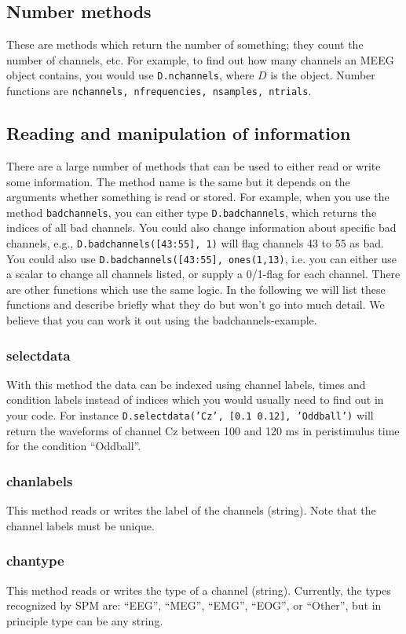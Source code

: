 \subsection{Number methods}
These are methods which return the number of something; they count the number of channels, etc. For example, to find out how many channels an MEEG object contains, you would use \texttt{D.nchannels}, where $D$ is the object. Number functions are \texttt{nchannels, nfrequencies, nsamples, ntrials}.

\subsection{Reading and manipulation of information}
There are a large number of methods that can be used to either read or write some information. The method name is the same but it depends on the arguments whether something is read or stored. For example, when you use the method \texttt{badchannels}, you can either type \texttt{D.badchannels}, which returns the indices of all bad channels. You could also change information about specific bad channels, e.g., \texttt{D.badchannels([43:55], 1)} will flag channels 43 to 55 as bad. You   could also use \texttt{D.badchannels([43:55], ones(1,13)}, i.e. you can either use a scalar to change all channels listed, or supply a 0/1-flag for each channel. There are other functions which use the same logic. In the following we will list these functions and describe briefly what they do but won't go into much detail. We believe that you can work it out using the badchannels-example.

\subsubsection{selectdata}
With this method the data can be indexed using channel labels, times and condition labels instead of indices which you would usually need to find out in your code. For instance \texttt{D.selectdata('Cz', [0.1 0.12], 'Oddball')} will return the waveforms of channel Cz between 100 and 120 ms in peristimulus time for the condition ``Oddball''.

\subsubsection{chanlabels}
This method reads or writes the label of the channels (string).  Note that the channel labels must be unique.

\subsubsection{chantype}
This method reads or writes the type of a channel (string). Currently, the types recognized by SPM are: ``EEG'', ``MEG'', ``EMG'', ``EOG'', or ``Other'', but in principle type can be any string.

